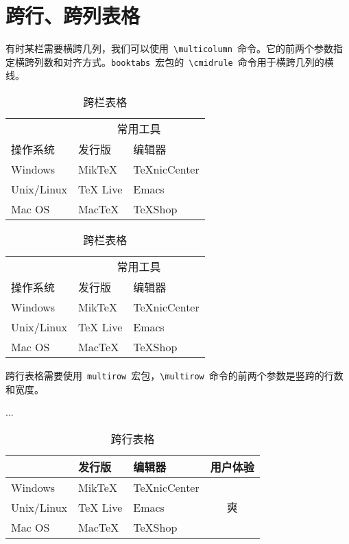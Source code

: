 \section{跨行、跨列表格}
有时某栏需要横跨几列，我们可以使用~\verb|\multicolumn|~命令。它的前两个参数指定横跨列数和对齐方式。\verb|booktabs|~宏包的~\verb|\cmidrule|~命令用于横跨几列的横线。
\begin{code}
\begin{table}[htbp]
\caption{跨栏表格}
\centering
\begin{tabular}{lll}
    \toprule
    & \multicolumn{2}{c}{常用工具} \\
    \cmidrule{2-3}
    操作系统 & 发行版 & 编辑器 \\
    \midrule
    Windows & MikTeX & TeXnicCenter \\
    Unix/Linux & TeX Live & Emacs \\
    Mac OS & MacTeX & TeXShop \\
    \bottomrule
\end{tabular}
\end{table}
\end{code}

\begin{table}[htbp]
\caption{跨栏表格}
\centering
\begin{tabular}{lll}
    \toprule
    & \multicolumn{2}{c}{常用工具} \\
    \cmidrule{2-3}
    操作系统 & 发行版 & 编辑器 \\
    \midrule
    Windows & MikTeX & TeXnicCenter \\
    Unix/Linux & TeX Live & Emacs \\
    Mac OS & MacTeX & TeXShop \\
    \bottomrule
\end{tabular}
\end{table}

跨行表格需要使用~\verb|multirow|~宏包，\verb|\multirow|~命令的前两个参数是竖跨的行数和宽度。
\begin{code}
\usepackage{multirow}
...
\begin{table}[htbp]
\caption{跨行表格}
\centering
\begin{tabular}{lllc}
\end{code}
\begin{code}
    \toprule
    操作系统 & 发行版 & 编辑器 & 用户体验\\
    \midrule
    Windows & MikTeX & TeXnicCenter & 
    \multirow{3}{*}{\centering 爽} \\
    Unix/Linux & TeX Live & Emacs \\
    Mac OS & MacTeX & TeXShop \\
    \bottomrule
\end{tabular}
\end{table}
\end{code}

